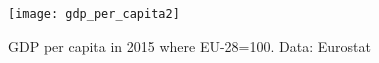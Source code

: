 \documentclass{tufte-handout}
\begin{document}
\begin{figure} \centering
    \texttt{[image: gdp\_per\_capita2]}
    \caption{GDP per capita in 2015 where EU-28=100. Data: Eurostat}
    \label{fig:gdp_per_capita}
  \end{figure}


\end{document}
